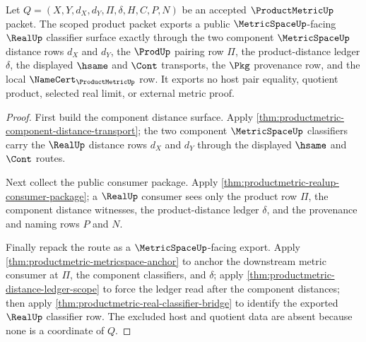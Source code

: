 \begin{theorem}
\label{thm:productmetric-real-classifier-public-export}
Let $Q=(X,Y,d_X,d_Y,\Pi,\delta,H,C,P,N)$ be an accepted $\ProductMetricUp$ packet. The scoped product packet exports a public $\MetricSpaceUp$-facing $\RealUp$ classifier surface exactly through the two component $\MetricSpaceUp$ distance rows $d_X$ and $d_Y$, the $\ProdUp$ pairing row $\Pi$, the product-distance ledger $\delta$, the displayed $\hsame$ and $\Cont$ transports, the $\Pkg$ provenance row, and the local $\NameCert_{\ProductMetricUp}$ row. It exports no host pair equality, quotient product, selected real limit, or external metric proof.
\end{theorem}
\begin{proof}
First build the component distance surface. Apply \autoref{thm:productmetric-component-distance-transport}; the two component $\MetricSpaceUp$ classifiers carry the $\RealUp$ distance rows $d_X$ and $d_Y$ through the displayed $\hsame$ and $\Cont$ routes.

Next collect the public consumer package. Apply \autoref{thm:productmetric-realup-consumer-package}; a $\RealUp$ consumer sees only the product row $\Pi$, the component distance witnesses, the product-distance ledger $\delta$, and the provenance and naming rows $P$ and $N$.

Finally repack the route as a $\MetricSpaceUp$-facing export. Apply \autoref{thm:productmetric-metricspace-anchor} to anchor the downstream metric consumer at $\Pi$, the component classifiers, and $\delta$; apply \autoref{thm:productmetric-distance-ledger-scope} to force the ledger read after the component distances; then apply \autoref{thm:productmetric-real-classifier-bridge} to identify the exported $\RealUp$ classifier row. The excluded host and quotient data are absent because none is a coordinate of $Q$.
\end{proof}

